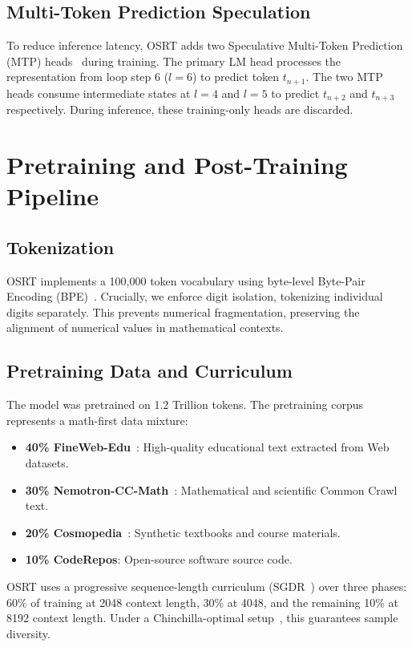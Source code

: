 \documentclass[11pt,twocolumn]{article}
\begin{document}
\subsection{Multi-Token Prediction Speculation}
To reduce inference latency, OSRT adds two Speculative Multi-Token Prediction (MTP) heads~\cite{gloeckle2024,deepseekv3} during training. The primary LM head processes the representation from loop step 6 ($l=6$) to predict token $t_{n+1}$. The two MTP heads consume intermediate states at $l=4$ and $l=5$ to predict $t_{n+2}$ and $t_{n+3}$ respectively. During inference, these training-only heads are discarded.

\section{Pretraining and Post-Training Pipeline}

\subsection{Tokenization}
OSRT implements a 100,000 token vocabulary using byte-level Byte-Pair Encoding (BPE)~\cite{bpe2015,gpt2tokenizer}. Crucially, we enforce digit isolation, tokenizing individual digits separately. This prevents numerical fragmentation, preserving the alignment of numerical values in mathematical contexts.

\subsection{Pretraining Data and Curriculum}
The model was pretrained on 1.2 Trillion tokens. The pretraining corpus represents a math-first data mixture:
\begin{itemize}
    \item \textbf{40\% FineWeb-Edu}~\cite{fineweb2024}: High-quality educational text extracted from Web datasets.
    \item \textbf{30\% Nemotron-CC-Math}~\cite{nemotronmath2025}: Mathematical and scientific Common Crawl text.
    \item \textbf{20\% Cosmopedia}~\cite{cosmopedia2024,phi12023}: Synthetic textbooks and course materials.
    \item \textbf{10\% CodeRepos}: Open-source software source code.
\end{itemize}
OSRT uses a progressive sequence-length curriculum (SGDR~\cite{sgdr2016}) over three phases: 60\% of training at 2048 context length, 30\% at 4048, and the remaining 10\% at 8192 context length. Under a Chinchilla-optimal setup~\cite{chinchilla2022}, this guarantees sample diversity.
\end{document}
